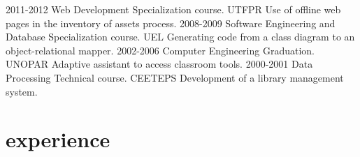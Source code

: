 \documentclass[]{src/twentysecondcv_en}
\begin{document}
\begin{twenty}
  \twentyitem
    {2011-2012}
    {Web Development Specialization course.}
    {UTFPR}
    {Use of offline web pages in the inventory of assets process.}
  \twentyitem
    {2008-2009}
    {Software Engineering and Database Specialization course.}
    {UEL}
    {Generating code from a class diagram to an object-relational mapper.}
  \twentyitem
    {2002-2006}
    {Computer Engineering Graduation.}
    {UNOPAR}
    {Adaptive assistant to access classroom tools.}
  \twentyitem
    {2000-2001}
    {Data Processing Technical course.}
    {CEETEPS}
    {Development of a library management system.}
\end{twenty}









\section{experience}
\end{document}
